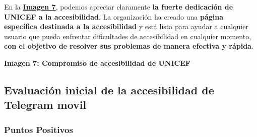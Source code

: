 \documentclass[a4paper]{article}
\newcommand{\accesibilidadUnicef}{accesibilidadUnicef.png}
\begin{document}
    En la \textbf{\hyperref[fig:imagen-compromiso-unicef]{Imagen 7}}, podemos apreciar claramente \textbf{la fuerte dedicación de UNICEF a la accesibilidad}. La organización ha creado una \textbf{página específica destinada a la accesibilidad} y está lista para ayudar a cualquier usuario que pueda enfrentar dificultades de accesibilidad en cualquier momento, \textbf{con el objetivo de resolver sus problemas de manera efectiva y rápida}.

    \vspace{5cm}
    \begin{center}
        \vspace{0.2cm}\par
        \textbf{Imagen 7: Compromiso de accesibilidad de UNICEF\label{fig:imagen-compromiso-unicef}}
    \end{center}

            
    \subsection{Evaluación inicial de la accesibilidad de Telegram movil}
    
    
    \subsubsection{Puntos Positivos}
    
\end{document}
